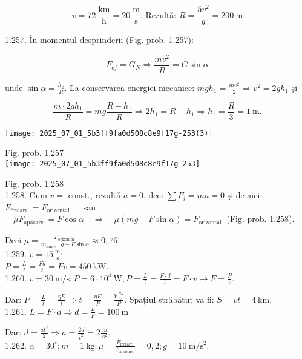 $$
v=72 \frac{\mathrm{~km}}{\mathrm{~h}}=20 \frac{\mathrm{~m}}{\mathrm{~s}} . \text { Rezultă: } R=\frac{5 v^{2}}{g}=200 \mathrm{~m}
$$

1.257. În momentul desprinderii (Fig. prob. 1.257):

$$
F_{c f}=G_{N} \Rightarrow \frac{m v^{2}}{R}=G \sin \alpha
$$

unde $\sin \alpha=\frac{h_{2}}{R}$. La conservarea energiei mecanice: $m g h_{1}=\frac{m v^{2}}{2} \Rightarrow v^{2}=2 g h_{1}$ şi

$$
\frac{m \cdot 2 g h_{1}}{R}=m g \frac{R-h_{1}}{R} \Rightarrow 2 h_{1}=R-h_{1} \Rightarrow h_{1}=\frac{R}{3}=1 \mathrm{~m} .
$$

\begin{center}
\texttt{[image: 2025\_07\_01\_5b3ff9fa0d508c8e9f17g-253(3)]}
\end{center}

Fig. prob. 1.257\\
\texttt{[image: 2025\_07\_01\_5b3ff9fa0d508c8e9f17g-253]}

Fig. prob. 1.258\\
1.258. Cum $v=$ const., rezultǎ $a=0$, deci $\sum F_{i}=m a=0$ şi de aici $F_{\text {frecare }}=F_{\text {orizontal }} \quad$ sau $\quad \mu F_{\text {apăsare }}=F \cos \alpha \quad \Rightarrow \quad \mu(m g-F \sin \alpha)=F_{\text {orizontal }}$ (Fig. prob. 1.258).

Deci $\mu=\frac{F_{\text {orizontal }}}{m_{\text {sanie }} \cdot g-F \sin \alpha} \approx 0,76$.\\
1.259. $v=15 \frac{\mathrm{~m}}{\mathrm{~s}}$;\\
$P=\frac{L}{t}=\frac{F d}{t}=F v=450 \mathrm{~kW}$.\\
1.260. $v=30 \mathrm{~m} / \mathrm{s} ; P=6 \cdot 10^{4} \mathrm{~W} ; P=\frac{L}{t}=\frac{F \cdot d}{t}=F \cdot v \rightarrow F=\frac{P}{v}$.

Dar: $P=\frac{L}{t}=\frac{\eta E}{t} \Rightarrow t=\frac{\eta E}{P}=\frac{V \frac{E s}{V}}{P}$. Spațiul străbătut va fi: $S=v t=4 \mathrm{~km}$.\\
1.261. $L=F \cdot d \Rightarrow d=\frac{L}{F}=100 \mathrm{~m}$

Dar: $d=\frac{a t^{2}}{2} \Rightarrow a=\frac{2 d}{t^{2}}=2 \frac{\mathrm{~m}}{\mathrm{~s}^{2}}$.\\
1.262. $\alpha=30^{\circ} ; m=1 \mathrm{~kg} ; \mu=\frac{F_{\text {frecare }}}{F_{\text {apăsare }}}=0,2 ; g=10 \mathrm{~m} / \mathrm{s}^{2}$.

